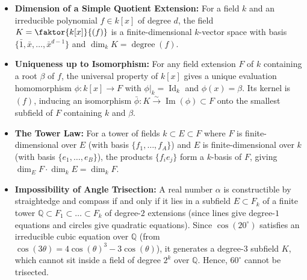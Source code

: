 \begin{overview}
\begin{itemize}
    \item \textbf{Dimension of a Simple Quotient Extension:} For a field $k$ and an irreducible polynomial $f \in k[x]$ of degree $d$, the field $K = \faktor{k[x]}{(f)}$ is a finite-dimensional $k$-vector space with basis $\{\bar{1}, \bar{x}, \dots, \bar{x}^{d-1}\}$ and $\dim_k K = \operatorname{degree}(f)$.
    \item \textbf{Uniqueness up to Isomorphism:} For any field extension $F$ of $k$ containing a root $\beta$ of $f$, the universal property of $k[x]$ gives a unique evaluation homomorphism $\phi \colon k[x] \to F$ with $\phi|_k = \operatorname{Id}_k$ and $\phi(x) = \beta$. Its kernel is $(f)$, inducing an isomorphism $\bar{\phi} \colon K \xrightarrow{\sim} \operatorname{Im}(\phi) \subset F$ onto the smallest subfield of $F$ containing $k$ and $\beta$.
    \item \textbf{The Tower Law:} For a tower of fields $k \subset E \subset F$ where $F$ is finite-dimensional over $E$ (with basis $\{f_1, \dots, f_A\}$) and $E$ is finite-dimensional over $k$ (with basis $\{e_1, \dots, e_B\}$), the products $\{f_i e_j\}$ form a $k$-basis of $F$, giving $\dim_E F \cdot \dim_k E = \dim_k F$.
    \item \textbf{Impossibility of Angle Trisection:} A real number $\alpha$ is constructible by straightedge and compass if and only if it lies in a subfield $E \subset F_k$ of a finite tower $\mathbb{Q} \subset F_1 \subset \dots \subset F_k$ of degree-$2$ extensions (since lines give degree-$1$ equations and circles give quadratic equations). Since $\cos(20^\circ)$ satisfies an irreducible cubic equation over $\mathbb{Q}$ (from $\cos(3\theta) = 4\cos(\theta)^3 - 3\cos(\theta)$), it generates a degree-$3$ subfield $K$, which cannot sit inside a field of degree $2^k$ over $\mathbb{Q}$. Hence, $60^\circ$ cannot be trisected.
\end{itemize}
\end{overview}